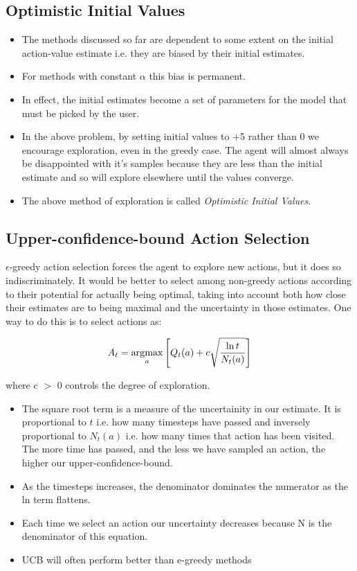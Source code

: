 \subsection{Optimistic Initial Values}
\begin{itemize}
\item The methods discussed so far are dependent to some extent on the initial action-value estimate i.e. they are biased by their initial estimates.
\item For methods with constant \(\alpha\) this bias is permanent.
\item In effect, the initial estimates become a set of parameters for the model that must be picked by the user.
\item In the above problem, by setting initial values to +5 rather than 0 we encourage exploration, even in the greedy case. The agent will almost always be disappointed with it's samples because they are less than the initial estimate and so will explore elsewhere until the values converge.
\item The above method of exploration is called \textit{Optimistic Initial Values}.
\end{itemize}

\subsection{Upper-confidence-bound Action Selection}
\(\epsilon\)-greedy action selection forces the agent to explore new actions, but it does so indiscriminately. It would be better to select among non-greedy actions according to their potential for actually being optimal, taking into account both how close their estimates are to being maximal and the uncertainty in those estimates. One way to do this is to select actions as:

\begin{equation}
	A_t = \operatorname*{\arg\!\max}_a \left[Q_t(a) + c\sqrt{\frac{\ln t}{N_t(a)}}\right]
\end{equation}

where c \(>\) 0 controls the degree of exploration.

\begin{itemize}
	\item The square root term is a measure of the uncertainity in our estimate. It is proportional to \(t\) i.e. how many timesteps have passed and inversely proportional to \(N_t(a)\) i.e. how many times that action has been visited. The more time has passed, and the less we have sampled an action, the higher our upper-confidence-bound.
	\item As the timesteps increases, the denominator dominates the numerator as the ln term flattens.
	\item Each time we select an action our uncertainty decreases because N is the denominator of this equation.
	\item UCB will often perform better than e-greedy methods
\end{itemize}

